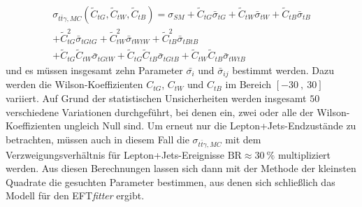 \begin{align}
  \sigma_{t\bar{t}\gamma, MC}({\tilde{C}_{tG}, \tilde{C}_{tW}, \tilde{C}_{tB}}) = \sigma_{SM} + \tilde{C}_{tG}\bar{\sigma}_{tG} + \tilde{C}_{tW}\bar{\sigma}_{tW} + \tilde{C}_{tB}\bar{\sigma}_{tB}\\ \nonumber
  + \tilde{C}_{tG}^2\bar{\sigma}_{tGtG} + \tilde{C}_{tW}^2\bar{\sigma}_{tWtW} + \tilde{C}_{tB}^2\bar{\sigma}_{tBtB}\\
  + \tilde{C}_{tG} \tilde{C}_{tW}\bar{\sigma}_{tGtW} + \tilde{C}_{tG} \tilde{C}_{tB}\bar{\sigma}_{tGtB} + \tilde{C}_{tW} \tilde{C}_{tB}\bar{\sigma}_{tWtB} \nonumber
\end{align}
und es müssen insgesamt zehn Parameter $\bar{\sigma_i}$ und $\bar{\sigma}_{ij}$ bestimmt werden. Dazu werden die Wilson-Koeffizienten $C_{tG}$, $C_{tW}$ und $C_{tB}$ im Bereich $[-30~,~30]$ variiert. Auf Grund der statistischen Unsicherheiten werden insgesamt $50$ verschiedene Variationen durchgeführt, bei denen ein, zwei oder alle der Wilson-Koeffizienten ungleich Null sind.
Um erneut nur die Lepton+Jets-Endzustände zu betrachten, müssen auch in diesem Fall die $\sigma_{t\bar{t}\gamma, MC}$ mit dem Verzweigungsverhältnis für Lepton+Jets-Ereignisse $\mathrm{BR} \approx \SI{30}{\percent}$ multipliziert werden.
Aus diesen Berechnungen lassen sich dann mit der Methode der kleinsten Quadrate die gesuchten Parameter bestimmen, aus denen sich schließlich das Modell für den EFT\textit{fitter} ergibt.


